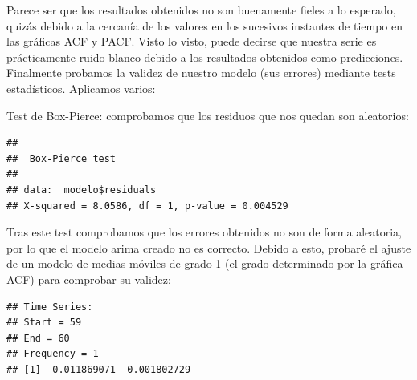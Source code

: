 \documentclass[]{article}
\newenvironment{Shaded}{\begin{snugshade}}{\end{snugshade}}
\newcommand{\KeywordTok}[1]{\textcolor[rgb]{0.13,0.29,0.53}{\textbf{#1}}}
\newcommand{\DataTypeTok}[1]{\textcolor[rgb]{0.13,0.29,0.53}{#1}}
\newcommand{\DecValTok}[1]{\textcolor[rgb]{0.00,0.00,0.81}{#1}}
\newcommand{\StringTok}[1]{\textcolor[rgb]{0.31,0.60,0.02}{#1}}
\newcommand{\CommentTok}[1]{\textcolor[rgb]{0.56,0.35,0.01}{\textit{#1}}}
\newcommand{\OperatorTok}[1]{\textcolor[rgb]{0.81,0.36,0.00}{\textbf{#1}}}
\newcommand{\NormalTok}[1]{#1}
\begin{document}
Parece ser que los resultados obtenidos no son buenamente fieles a lo
esperado, quizás debido a la cercanía de los valores en los sucesivos
instantes de tiempo en las gráficas ACF y PACF. Visto lo visto, puede
decirse que nuestra serie es prácticamente ruido blanco debido a los
resultados obtenidos como predicciones.\\
Finalmente probamos la validez de nuestro modelo (sus errores) mediante
tests estadísticos. Aplicamos varios:

Test de Box-Pierce: comprobamos que los residuos que nos quedan son
aleatorios:

\begin{Shaded}
\end{Shaded}

\begin{verbatim}
## 
##  Box-Pierce test
## 
## data:  modelo$residuals
## X-squared = 8.0586, df = 1, p-value = 0.004529
\end{verbatim}

Tras este test comprobamos que los errores obtenidos no son de forma
aleatoria, por lo que el modelo arima creado no es correcto. Debido a
esto, probaré el ajuste de un modelo de medias móviles de grado 1 (el
grado determinado por la gráfica ACF) para comprobar su validez:

\begin{Shaded}
\end{Shaded}

\begin{verbatim}
## Time Series:
## Start = 59 
## End = 60 
## Frequency = 1 
## [1]  0.011869071 -0.001802729
\end{verbatim}
\end{document}
